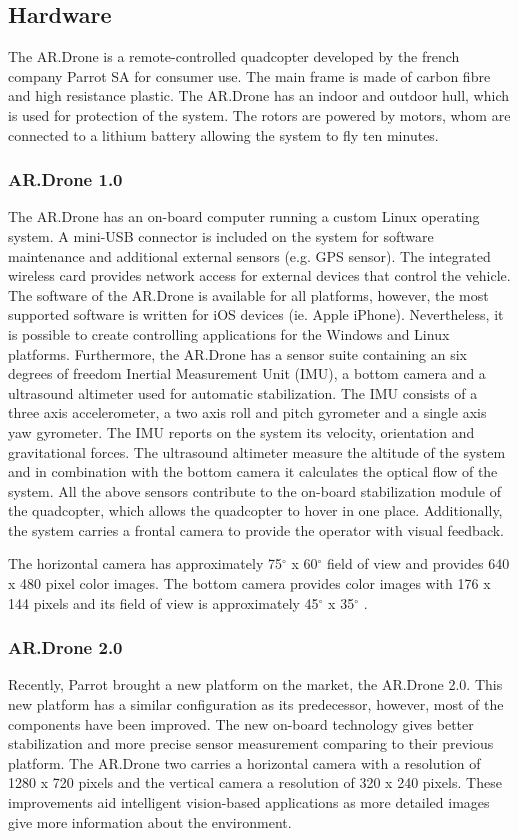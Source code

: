 \documentclass[a4paper]{article}
\begin{document}
\subsection{Hardware}
The AR.Drone is a remote-controlled quadcopter developed by the french company Parrot SA for consumer use. The main frame is made of carbon fibre and high resistance plastic. The AR.Drone has an indoor and outdoor hull, which is used for protection of the system. The rotors are powered by motors, whom are connected to a lithium battery allowing the system to fly ten minutes.

\subsubsection{AR.Drone 1.0}
The AR.Drone has an on-board computer running a custom Linux operating system. A mini-USB connector is included on the system for software maintenance and additional external sensors (e.g. GPS sensor). The integrated wireless card provides network access for external devices that control the vehicle. The software of the AR.Drone is available for all platforms, however, the most supported software is written for iOS devices (ie. Apple iPhone). Nevertheless, it is possible to create controlling applications for the Windows and Linux platforms. Furthermore, the AR.Drone has a sensor suite containing an six degrees of freedom Inertial Measurement Unit (IMU), a bottom camera and a ultrasound altimeter used for automatic stabilization. The IMU consists of a three axis accelerometer, a two axis roll and pitch gyrometer and a single axis yaw gyrometer. The IMU reports on the system its velocity, orientation and gravitational forces. The ultrasound altimeter measure the altitude of the system and in combination with the bottom camera it calculates the optical flow of the system. All the above sensors contribute to the on-board stabilization module of the quadcopter, which allows the quadcopter to hover in one place. Additionally, the system carries a frontal camera to provide the operator with visual feedback.

The horizontal camera has approximately 75$^{\circ}$ x 60$^{\circ}$ field of view and provides 640 x 480 pixel color images. The bottom camera provides color images with 176 x 144 pixels and its field of view is approximately 45$^{\circ}$ x 35$^{\circ}$ \cite{Krajnik2011}.

\subsubsection{AR.Drone 2.0}
Recently, Parrot brought a new platform on the market, the AR.Drone 2.0. This new platform has a similar configuration as its predecessor, however, most of the components have been improved. The new on-board technology gives better stabilization and more precise sensor measurement comparing to their previous platform. The AR.Drone two carries a horizontal camera with a resolution of 1280 x 720 pixels and the vertical camera a resolution of 320 x 240 pixels. These improvements aid intelligent vision-based applications as more detailed images give more information about the environment.
\end{document}
